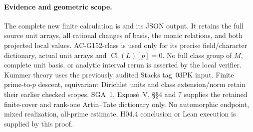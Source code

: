 \paragraph{Evidence and geometric scope.}
The complete new finite calculation is
 and its JSON output.
It retains the full source unit arrays, all rational changes of
basis, the monic relations, and both projected local values.
AC-G152-class is used only for its precise field/character
dictionary, actual unit arrays and $\operatorname{Cl}(L)[p]=0$.
No full class group of $M$, complete unit basis, or analytic
interval rerun is asserted by the local verifier.
Kummer theory uses the previously audited Stacks tag~03PK input.
Finite prime-to-$p$ descent, equivariant Dirichlet units and
class extension/norm retain their earlier checked scopes.
SGA~1, Expos\'e~V, \S\S4 and 7 supplies the retained finite-cover
and rank-one Artin--Tate dictionary only.
No automorphic endpoint, mixed realization, all-prime estimate,
H04.4 conclusion or Lean execution is supplied by this proof.
